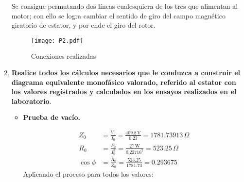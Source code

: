 \documentclass[a4paper,11pt]{article}
\newcommand{\mrm}{\mathrm}
\begin{document}
\begin{enumerate}
    Se consigue permutando dos líneas cualesquiera de los tres que alimentan al motor; con ello se logra cambiar el sentido de giro del campo magnético giratorio de estator, y por ende el giro del rotor.
    
    \begin{figure}[H]
        \centering
        \texttt{[image: P2.pdf]}
        \caption{Conexiones realizadas}
    \end{figure}
    \item \textbf{Realice todos los cálculos necesarios que le conduzca a construir el diagrama equivalente monofásico valorado, referido al estator con los valores registrados y calculados en los ensayos realizados en el laboratorio}.
    
    \begin{itemize}
        \item \textbf{Prueba de vacío.}
        \begin{table}[H]
            \centering
            \caption{Datos obtenidos en la prueba de vacío}
        \end{table}
        \begin{align*}
            Z_{0} &= \frac{V_{0}}{I_{0}} = \frac{409.8\,\mrm{V}}{0.23} = 1781.73913\,\Omega\\
            R_{0} &= \frac{P_{0}}{I^{2}_{0}} = \frac{27\,\mrm{W}}{0.22716^{2}} = 523.25\,\Omega\\
            \cos\phi &= \frac{R_{0}}{Z_{0}} = \frac{523.25}{1781.73} = 0.293675
        \end{align*}
        Aplicando el proceso para todos los valores:
        \begin{table}[H]

\end{table}
\end{itemize}
\end{enumerate}
\end{document}
